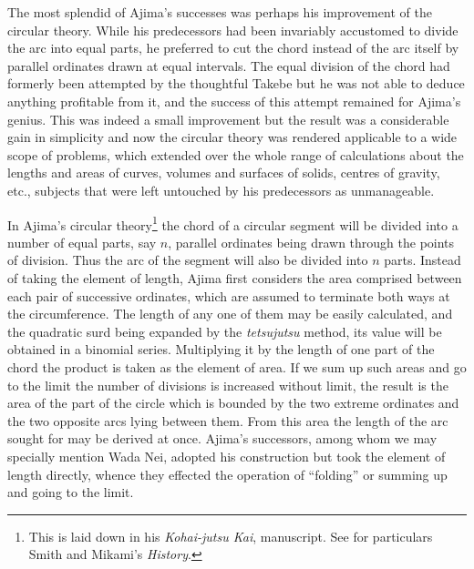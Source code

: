 \documentclass[11pt]{article}
\newcommand{\scanpage}[2]{\clearpage\setcounter{footnote}{0}\noindent{\footnotesize\color{gray}PDF page #1 · #2}\par\medskip}
\newcommand{\scanfooter}{}
\begin{document}
The most splendid of Ajima's successes was perhaps his improvement of the circular theory. While his predecessors had been invariably accustomed to divide the arc into equal parts, he preferred to cut the chord instead of the arc itself by parallel ordinates drawn at equal intervals. The equal division of the chord had formerly been attempted by the thoughtful Takebe but he was not able to deduce anything profitable from it, and the success of this attempt remained for Ajima's genius. This was indeed a small improvement but the result was a considerable gain in simplicity and now the circular theory was rendered applicable to a wide scope of problems, which extended over the whole range of calculations about the lengths and areas of curves, volumes and surfaces of solids, centres of gravity, etc., subjects that were left untouched by his predecessors as unmanageable.
\scanfooter

\scanpage{0185}{Chapter 22, printed page 171}
In Ajima's circular theory\footnote{This is laid down in his \emph{Kohai-jutsu Kai}, manuscript. See for particulars Smith and Mikami's \emph{History}.} the chord of a circular segment will be divided into a number of equal parts, say $n$, parallel ordinates being drawn through the points of division. Thus the arc of the segment will also be divided into $n$ parts. Instead of taking the element of length, Ajima first considers the area comprised between each pair of successive ordinates, which are assumed to terminate both ways at the circumference. The length of any one of them may be easily calculated, and the quadratic surd being expanded by the \emph{tetsujutsu} method, its value will be obtained in a binomial series. Multiplying it by the length of one part of the chord the product is taken as the element of area. If we sum up such areas and go to the limit the number of divisions is increased without limit, the result is the area of the part of the circle which is bounded by the two extreme ordinates and the two opposite arcs lying between them. From this area the length of the arc sought for may be derived at once. Ajima's successors, among whom we may specially mention Wada Nei, adopted his construction but took the element of length directly, whence they effected the operation of ``folding'' or summing up and going to the limit.
\end{document}
